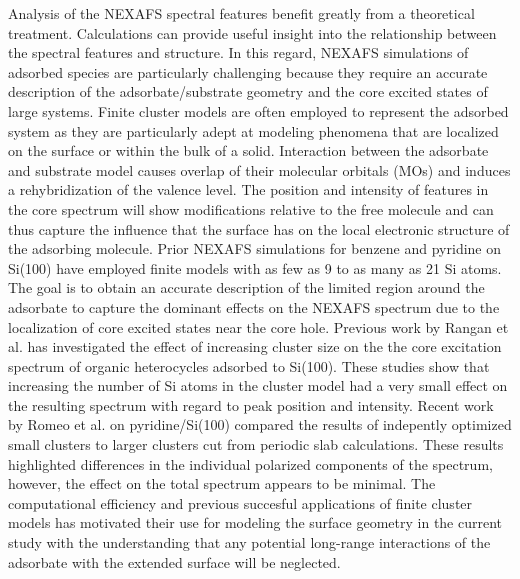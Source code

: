 \documentclass{article}
\begin{document}
Analysis of the NEXAFS spectral features benefit greatly from a theoretical treatment.  Calculations can provide useful insight into the relationship between the spectral features and structure. \cite{triguero_calculations_1998} In this regard, NEXAFS simulations of adsorbed species are particularly challenging because they require an accurate description of the adsorbate/substrate geometry and the core excited states of large systems.\cite{romeo_n1s_2014,besley_time-dependent_2007,fronzoni_density_2012} Finite cluster models are often employed to represent the adsorbed system as they are particularly adept at modeling phenomena that are localized on the surface or within the bulk of a solid.\cite{besley_time-dependent_2007,de_francesco_tddft_2007,francesco_s_2009} Interaction between the adsorbate and substrate model causes overlap of their molecular orbitals (MOs) and induces a rehybridization of the valence level. The position and intensity of features in the core spectrum will show modifications relative to the free molecule and can thus capture the influence that the surface has on the local electronic structure of the adsorbing molecule. Prior NEXAFS simulations for benzene and pyridine on Si(100) have employed finite models with as few as 9 to as many as 21 Si atoms. \cite{coustel_pyridine_2012} The goal is to obtain an accurate description of the limited region around the adsorbate to capture the dominant effects on the NEXAFS spectrum due to the localization of core excited states near the core hole. Previous work by Rangan et al. has investigated the effect of increasing cluster size on the the core excitation spectrum of organic heterocycles adsorbed to Si(100). \cite{rangan_adsorption_2005,rangan_experimental_2005} These studies show that increasing the number of Si atoms in the cluster model had a very small effect on the resulting spectrum with regard to peak position and intensity. Recent work by Romeo et al. on pyridine/Si(100) compared the results of indepently optimized small clusters to larger clusters cut from periodic slab calculations. \cite{romeo_n1s_2014} These results highlighted differences in the individual polarized components of the spectrum, however, the effect on the total spectrum appears to be minimal. The computational efficiency and previous succesful applications of finite cluster models has motivated their use for modeling the surface geometry in the current study with the understanding that any potential long-range interactions of the adsorbate with the extended surface will be neglected.
\end{document}
